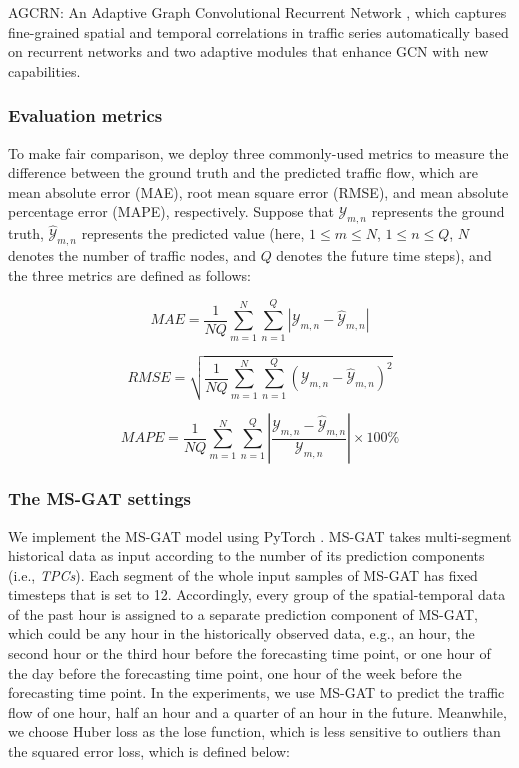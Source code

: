AGCRN: An Adaptive Graph Convolutional Recurrent Network \cite{bai2020adaptive}, which captures fine-grained spatial and temporal correlations in traffic series automatically based on recurrent networks and two adaptive modules that enhance GCN with new capabilities. 

\subsubsection{Evaluation metrics}
To make fair comparison, we deploy three commonly-used metrics to measure the difference between the ground truth and the predicted traffic flow, which are mean absolute error (MAE), root mean square error (RMSE), and mean absolute percentage error (MAPE), respectively. Suppose that $\mathcal{Y}_{m,n}$ represents the ground truth, $\hat{\mathcal{Y}}_{m,n}$ represents the predicted value (here, $1 \leq m \leq N$, $1 \leq n \leq Q$, $N$ denotes the number of traffic nodes, and $Q$ denotes the future time steps), and the three metrics are defined as follows:

\begin{equation}
    \label{eqn:mae}
    MAE = \frac{1}{NQ} \sum\limits_{m=1}^{N}\sum\limits_{n=1}^{Q} \left | \mathcal{Y}_{m,n} - \hat{\mathcal{Y}}_{m,n} \right |
\end{equation}

\begin{equation}
    \label{eqn:rmse}
    RMSE = \sqrt{\frac{1}{NQ} \sum\limits_{m=1}^{N}\sum\limits_{n=1}^{Q} \left ( \mathcal{Y}_{m,n} - \hat{\mathcal{Y}}_{m,n} \right )^2}
\end{equation}

\begin{equation}
    \label{eqn:mape}
    MAPE = \frac{1}{NQ} \sum\limits_{m=1}^{N}\sum\limits_{n=1}^{Q} \left | \frac{ \mathcal{Y}_{m,n} - \hat{\mathcal{Y}}_{m,n}}{\mathcal{Y}_{m,n}} \right | \times 100 \%
\end{equation}

\subsubsection{The MS-GAT settings}
We implement the MS-GAT model using PyTorch \cite{ketkar2017introduction}. MS-GAT takes multi-segment historical data as input according to the number of its prediction components (i.e., \textit{TPCs}). Each segment of the whole input samples of MS-GAT has fixed timesteps that is set to 12. Accordingly, every group of the spatial-temporal data of the past hour is assigned to a separate prediction component of MS-GAT, which could be any hour in the historically observed data, e.g., an hour, the second hour or the third hour before the forecasting time point, or one hour of the day before the forecasting time point, one hour of the week before the forecasting time point. In the experiments, we use MS-GAT to predict the traffic flow of one hour, half an hour and a quarter of an hour in the future. Meanwhile, we choose Huber loss \cite{huber1992robust} as the lose function, which is less sensitive to outliers than the squared error loss, which is defined below:

